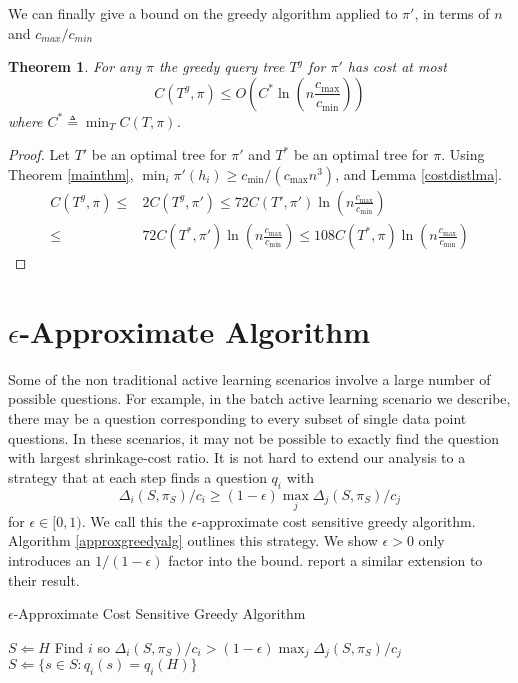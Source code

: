 \documentclass{article}
\newtheorem{theorem}{Theorem}
\begin{document}
We can finally give a bound on the greedy algorithm applied to $\pi'$,
in terms of $n$ and $c_{max}/c_{min}$
\begin{theorem}  
For any $\pi$ the greedy query tree $T^g$ for $\pi'$ has cost 
at most 
\[ C(T^g, \pi) \leq O(C^* \ln (n \frac{c_{\max}}{c_{\min}})) \]
where $C^* \triangleq \min_T C(T, \pi)$.  \label{distinthm} \end{theorem}
\begin{proof}
Let $T'$ be an optimal tree for $\pi'$ and $T^*$ be an optimal
tree for $\pi$.
Using Theorem \ref{mainthm},  $\min_{i} \pi'(h_i) \geq c_{\min}/(c_{\max}n^3)$, 
and  Lemma \ref{costdistlma}.
\begin{align*}
C(T^g, \pi) \leq & 2C(T^g, \pi') 
\leq 72 C(T', \pi') \ln (n \frac{c_{\max}}{c_{\min}}) \\
 \leq & 72 C(T^*, \pi') \ln (n \frac{c_{\max}}{c_{\min}}) 
 \leq  108 C(T^*, \pi) \ln (n \frac{c_{\max}}{c_{\min}})
\end{align*}
\end{proof}

\section{$\epsilon$-Approximate Algorithm}

Some of the non traditional active learning scenarios involve a large
number of possible questions.  For example, in the batch active
learning scenario we describe, there may be a question corresponding
to every subset of single data point questions.  In these scenarios,
it may not be possible to exactly find the question with largest
shrinkage-cost ratio.  It is not hard
to extend our analysis to a strategy that at each step finds a
question $q_i$ with 
\[ \Delta_i(S, \pi_S) / c_i \geq (1 - \epsilon)
\max_j \Delta_j(S, \pi_S) / c_j \]
for $\epsilon \in [0, 1)$.  
We call this the $\epsilon$-approximate
cost sensitive greedy algorithm.  Algorithm \ref{approxgreedyalg} outlines this
strategy.  We show $\epsilon > 0$ only introduces an
$1/(1 - \epsilon)$ factor into the bound.  \citet{optimalsplit}
report a similar extension to their result.

\begin{algorithm}[t]
\caption{$\epsilon$-Approximate Cost Sensitive Greedy Algorithm}
\begin{algorithmic}[1]
\STATE $S \Leftarrow H$
\REPEAT
\STATE Find $i$ so
$\Delta_i(S, \pi_S) / c_i > (1 - \epsilon) \max_j \Delta_j(S, \pi_S) / c_j$
\STATE $S \Leftarrow \lbrace s \in S : q_i(s) = q_i(H) \rbrace$
\end{algorithmic}
\label{approxgreedyalg}
\end{algorithm}
\end{document}
